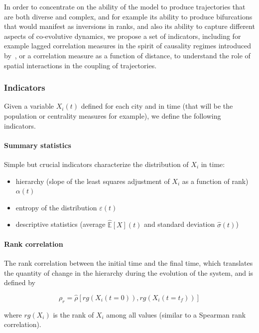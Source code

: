 \documentclass[graybox]{svmult}
\begin{document}
In order to concentrate on the ability of the model to produce trajectories that are both diverse and complex, and for example its ability to produce bifurcations that would manifest as inversions in ranks, and also its ability to capture different aspects of co-evolutive dynamics, we propose a set of indicators, including for example lagged correlation measures in the spirit of causality regimes introduced by~\cite{raimbault2017identification}, or a correlation measure as a function of distance, to understand the role of spatial interactions in the coupling of trajectories.

\subsubsection{Indicators}

Given a variable $X_i(t)$ defined for each city and in time (that will be the population or centrality measures for example), we define the following indicators.

\paragraph{Summary statistics}

Simple but crucial indicators characterize the distribution of $X_i$ in time:
\begin{itemize}
	\item hierarchy (slope of the least squares adjustment of $X_i$ as a function of rank) $\alpha (t)$
	\item entropy of the distribution $\varepsilon (t)$
	\item descriptive statistics (average $\hat{\mathbb{E}}\left[X\right] (t)$ and standard deviation $\hat{\sigma} (t)$)
\end{itemize}


\paragraph{Rank correlation}

The rank correlation between the initial time and the final time, which translates the quantity of change in the hierarchy during the evolution of the system, and is defined by

\begin{equation}
\rho_r = \hat{\rho}\left[rg(X_i(t=0)),rg(X_i(t=t_f))\right]
\end{equation}

where $rg(X_i)$ is the rank of $X_i$ among all values (similar to a Spearman rank correlation).
\end{document}
